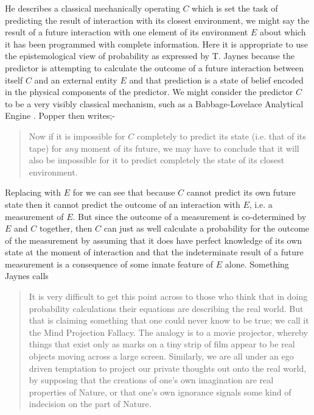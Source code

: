 \par
He describes a classical mechanically operating  $C$ which is set the task of predicting the result of interaction with its closest environment, we might say the result of a future interaction with one element of its environment $E$ about which it has been programmed with complete information. Here it is appropriate to use the epistemological view of probability as expressed by T. Jaynes because the predictor is attempting to calculate the outcome of a future interaction between itself $C$ and an external entity $E$ and that prediction is a state of belief encoded in the physical components of the predictor. We might consider the predictor $C$ to be a very visibly classical mechanism, such as a Babbage-Lovelace Analytical Engine \autocite{Menabrea1843SketchBabbage}. Popper then writes;-
\begin{quotation}
  Now if it is impossible for $C$ completely to predict its state (i.e. that of its tape) for \emph{any} moment of its future, we may have to conclude that it will also be impossible for it to predict completely the state of its closest environment.
  \par
  \hfill \autocite[p.~178]{Popper1950b}
\end{quotation}
\par
Replacing  with $E$ for  we can see that because $C$ cannot predict its own future state then it cannot predict the outcome of an interaction with $E$, i.e. a measurement of $E$. But since the outcome of a measurement is co-determined by $E$ and $C$ together, then $C$ can just as well calculate a probability for the outcome of the measurement by assuming that it does have perfect knowledge of its own state at the moment of interaction and that the indeterminate result  of a future measurement is a consequence of some innate feature of $E$ alone. Something Jaynes calls  
\begin{quotation}
  It is very difficult to get this point across to those who think that in doing probability calculations their equations are describing the real world. But that is claiming something that one could never know to be true; we call it the Mind Projection Fallacy. The analogy is to a movie projector, whereby things that exist only as marks on a tiny strip of film appear to be real objects moving across a large screen. Similarly, we are all under an ego driven temptation to project our private thoughts out onto the real world, by supposing that the creations of one's own imagination are real properties of Nature, or that one's own ignorance signals some kind of indecision on the part of Nature.
  \hfill \autocite{Jaynes1989}
\end{quotation}

